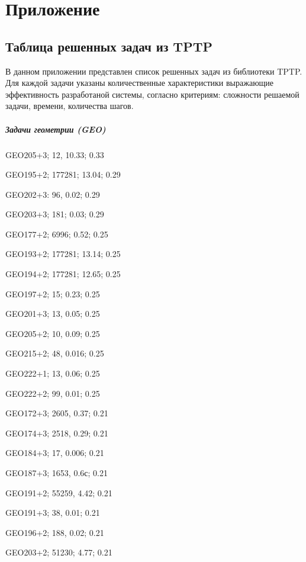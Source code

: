 \chapter*{Приложение}




\section*{Таблица решенных задач из TPTP}
В данном приложении представлен список решенных задач из библиотеки TPTP. Для каждой задачи указаны количественные характеристики выражающие эффективность разработаной системы, согласно критериям: сложности решаемой задачи, времени, количества шагов.

\paragraph{Задачи геометрии (GEO)}

GEO205+3; 12, 10.33; 0.33

GEO195+2; 177281; 13.04; 0.29

GEO202+3: 96, 0.02; 0.29

GEO203+3; 181; 0.03; 0.29

GEO177+2; 6996; 0.52; 0.25

GEO193+2; 177281; 13.14; 0.25

GEO194+2; 177281; 12.65; 0.25

GEO197+2; 15; 0.23; 0.25

GEO201+3; 13, 0.05; 0.25

GEO205+2; 10, 0.09; 0.25

GEO215+2; 48, 0.016; 0.25

GEO222+1; 13, 0.06; 0.25

GEO222+2; 99, 0.01; 0.25

GEO172+3; 2605, 0.37; 0.21

GEO174+3; 2518, 0.29; 0.21

GEO184+3; 17, 0.006; 0.21

GEO187+3; 1653, 0.6с; 0.21

GEO191+2; 55259, 4.42; 0.21

GEO191+3; 38, 0.01; 0.21

GEO196+2; 188, 0.02; 0.21

GEO203+2; 51230; 4.77; 0.21

